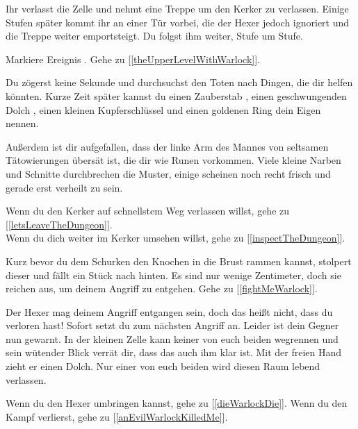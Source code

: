 Ihr verlasst die Zelle und nehmt eine Treppe um den Kerker zu verlassen. Einige Stufen später kommt ihr an einer Tür vorbei, die der Hexer jedoch ignoriert und die Treppe weiter emportsteigt. Du folgst ihm weiter, Stufe um Stufe.

Markiere Ereignis . Gehe zu [\ref{theUpperLevelWithWarlock}].


Du zögerst keine Sekunde und durchsuchst den Toten nach Dingen, die dir helfen könnten.
Kurze Zeit später kannst du einen Zauberstab , einen geschwungenden Dolch , einen kleinen Kupferschlüssel  und einen goldenen Ring  dein Eigen nennen.

Außerdem ist dir aufgefallen, dass der linke Arm des Mannes von seltsamen Tätowierungen übersät ist, die dir wie Runen vorkommen. Viele kleine Narben und Schnitte durchbrechen die Muster, einige scheinen noch recht frisch und gerade erst verheilt zu sein.

Wenn du den Kerker auf schnellstem Weg verlassen willst, gehe zu [\ref{letsLeaveTheDungeon}].
\\Wenn du dich weiter im Kerker umsehen willst, gehe zu [\ref{inspectTheDungeon}].


Kurz bevor du dem Schurken den Knochen in die Brust rammen kannst, stolpert dieser und fällt ein Stück nach hinten. Es sind nur wenige Zentimeter, doch sie reichen aus, um deinem Angriff zu entgehen. Gehe zu [\ref{fightMeWarlock}].


Der Hexer mag deinem Angriff entgangen sein, doch das heißt nicht, dass du verloren hast! Sofort setzt du zum nächsten Angriff an. Leider ist dein Gegner nun gewarnt. In der kleinen Zelle kann keiner von euch beiden wegrennen und sein wütender Blick verrät dir, dass das auch ihm klar ist. Mit der freien Hand zieht er einen Dolch. Nur einer von euch beiden wird diesen Raum lebend verlassen.

\monsterWarlock

Wenn du den Hexer umbringen kannst, gehe zu [\ref{dieWarlockDie}].
Wenn du den Kampf verlierst, gehe zu [\ref{anEvilWarlockKilledMe}].



